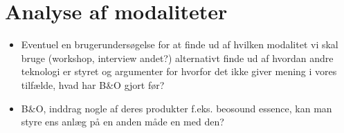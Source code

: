 \chapter{Analyse af modaliteter}
\label{Analyse af modaliteter}
%
\begin{itemize}
  \item Eventuel en brugerundersøgelse for at finde ud af hvilken modalitet vi skal bruge (workshop, interview andet?) alternativt finde ud af hvordan andre teknologi er styret og argumenter for hvorfor det ikke giver mening i vores tilfælde, hvad har B$\&$O gjort før?
  \item B$\&$O, inddrag nogle af deres produkter f.eks. beosound essence, kan man styre ens anlæg på en anden måde en med den?
\end{itemize}



